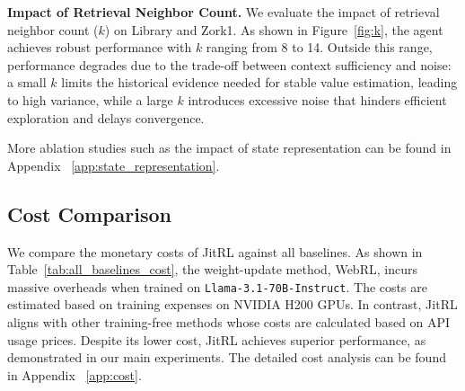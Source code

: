 \textbf{Impact of Retrieval Neighbor Count.} We evaluate the impact of retrieval neighbor count ($k$) on  Library and Zork1. As shown in Figure~\ref{fig:k}, the agent achieves robust performance with $k$ ranging from 8 to 14. Outside this range, performance degrades due to the trade-off between context sufficiency and noise: a small $k$ limits the historical evidence needed for stable value estimation, leading to high variance, while a large $k$ introduces excessive noise that hinders efficient exploration and delays convergence.

More ablation studies such as the impact of state representation can be found in Appendix ~\ref{app:state_representation}.



% 

\subsection{Cost Comparison}

We compare the monetary costs of JitRL against all baselines. As shown in Table~\ref{tab:all_baselines_cost}, the weight-update method, WebRL, incurs massive overheads when trained on  \texttt{Llama-3.1-70B-Instruct}. The costs are estimated based on training expenses on NVIDIA H200 GPUs. In contrast, JitRL aligns with other training-free methods whose costs are calculated based on API usage prices. Despite its lower cost, JitRL achieves superior performance, as demonstrated in our main experiments. The detailed cost analysis can be found in Appendix ~\ref{app:cost}.



 